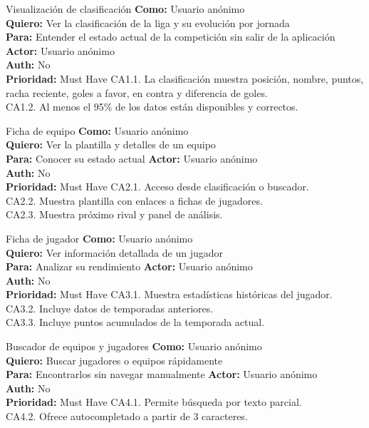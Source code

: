 {Visualización de clasificación}
{\textbf{Como:} Usuario anónimo\\ \textbf{Quiero:} Ver la clasificación de la liga y su evolución por jornada\\ \textbf{Para:} Entender el estado actual de la competición sin salir de la aplicación}
{\textbf{Actor:} Usuario anónimo\\ \textbf{Auth:} No\\ \textbf{Prioridad:} Must Have}
{CA1.1. La clasificación muestra posición, nombre, puntos, racha reciente, goles a favor, en contra y diferencia de goles.\\ CA1.2. Al menos el 95\% de los datos están disponibles y correctos.}

{Ficha de equipo}
{\textbf{Como:} Usuario anónimo\\ \textbf{Quiero:} Ver la plantilla y detalles de un equipo\\ \textbf{Para:} Conocer su estado actual}
{\textbf{Actor:} Usuario anónimo\\ \textbf{Auth:} No\\ \textbf{Prioridad:} Must Have}
{CA2.1. Acceso desde clasificación o buscador.\\ CA2.2. Muestra plantilla con enlaces a fichas de jugadores.\\ CA2.3. Muestra próximo rival y panel de análisis.}

{Ficha de jugador}
{\textbf{Como:} Usuario anónimo\\ \textbf{Quiero:} Ver información detallada de un jugador\\ \textbf{Para:} Analizar su rendimiento}
{\textbf{Actor:} Usuario anónimo\\ \textbf{Auth:} No\\ \textbf{Prioridad:} Must Have}
{CA3.1. Muestra estadísticas históricas del jugador.\\ CA3.2. Incluye datos de temporadas anteriores.\\ CA3.3. Incluye puntos acumulados de la temporada actual.}

{Buscador de equipos y jugadores}
{\textbf{Como:} Usuario anónimo\\ \textbf{Quiero:} Buscar jugadores o equipos rápidamente\\ \textbf{Para:} Encontrarlos sin navegar manualmente}
{\textbf{Actor:} Usuario anónimo\\ \textbf{Auth:} No\\ \textbf{Prioridad:} Must Have}
{CA4.1. Permite búsqueda por texto parcial.\\ CA4.2. Ofrece autocompletado a partir de 3 caracteres.}

